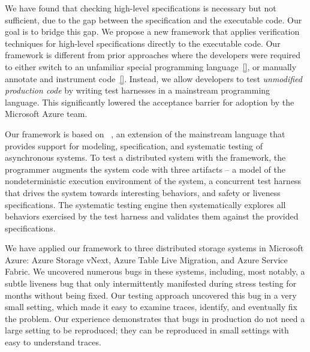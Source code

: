 We have found that checking high-level specifications is necessary but not sufficient, due to the gap between the specification and the executable code.
Our goal is to bridge this gap. We propose a new framework that
applies verification techniques for high-level specifications directly
to the executable code. Our framework is different from prior
approaches where the developers were required to either switch to an
unfamiliar special programming language~\ref{}, or manually annotate
and instrument code~\ref{}. Instead, we allow developers to test
{\em unmodified production code} by writing test harnesses in a
mainstream programming language. This
significantly lowered the acceptance barrier for adoption by the
Microsoft Azure team.

Our framework is based on \psharp~\cite{deligiannis2015psharp}, an extension of the mainstream language \csharp that provides support for modeling, specification, and systematic testing of asynchronous systems.
To test a distributed system with the \psharp framework, the programmer augments the system code with three artifacts -- a model of the nondeterministic execution environment of the system, a concurrent test harness that drives the system towards interesting behaviors, and safety or liveness specifications.
The \psharp systematic testing engine then systematically explores all behaviors exercised by the test harness and validates them against the provided specifications.

We have applied our framework to three distributed storage systems in Microsoft Azure: Azure Storage vNext, Azure Table Live Migration, 
and Azure Service Fabric.
We uncovered numerous bugs in these systems, including, most notably, a subtle liveness bug that only intermittently 
manifested during stress testing for months without being fixed.
Our testing approach uncovered this bug in a very small setting, which made it easy to examine traces, identify, and eventually fix the problem.
Our experience demonstrates that bugs in production do not need a large setting to be reproduced;
they can be reproduced in small settings with easy to understand traces.

